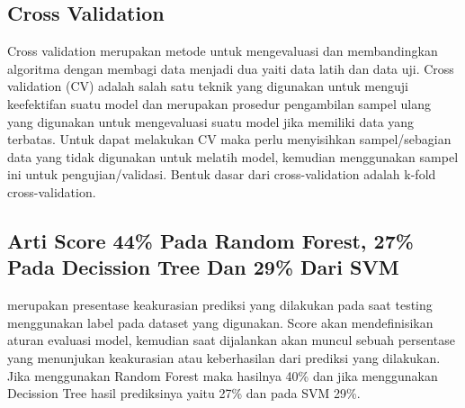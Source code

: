 \subsection{Cross Validation}
Cross validation merupakan metode untuk mengevaluasi dan membandingkan algoritma dengan membagi data menjadi dua yaiti data latih dan data uji. Cross validation (CV) adalah salah satu teknik yang digunakan untuk menguji keefektifan suatu model dan merupakan prosedur pengambilan sampel ulang yang digunakan untuk mengevaluasi suatu model jika memiliki data yang terbatas. Untuk dapat melakukan CV maka perlu menyisihkan sampel/sebagian data yang tidak digunakan untuk melatih model, kemudian menggunakan sampel ini untuk pengujian/validasi. Bentuk dasar dari cross-validation adalah k-fold cross-validation.

\subsection{Arti Score 44\% Pada Random Forest, 27\% Pada Decission Tree Dan 29\% Dari SVM}
merupakan presentase keakurasian prediksi yang dilakukan pada saat testing
menggunakan label pada dataset yang digunakan. Score akan mendefinisikan
aturan evaluasi model, kemudian saat dijalankan akan muncul sebuah persentase yang menunjukan keakurasian atau keberhasilan dari prediksi yang dilakukan. Jika
menggunakan Random Forest maka hasilnya 40\% dan jika menggunakan Decission Tree hasil prediksinya yaitu 27\% dan pada SVM 29\%.

